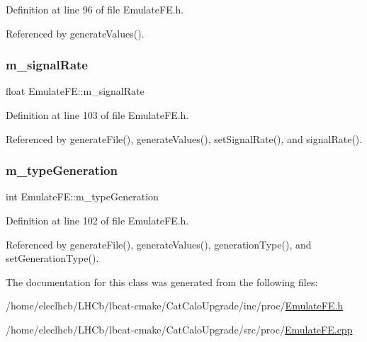 Definition at line 96 of file Emulate\+F\+E.\+h.



Referenced by generate\+Values().

\mbox{\label{classEmulateFE_a7aeff9e62f850ca6d7ee27dce02a060b}} 
\subsubsection{\texorpdfstring{m\+\_\+signal\+Rate}{m\_signalRate}}
{\footnotesize\ttfamily float Emulate\+F\+E\+::m\+\_\+signal\+Rate\hspace{0.3cm}{\ttfamily [private]}}



Definition at line 103 of file Emulate\+F\+E.\+h.



Referenced by generate\+File(), generate\+Values(), set\+Signal\+Rate(), and signal\+Rate().

\mbox{\label{classEmulateFE_aa8bd0aa42cc5f3d52930408807b3067c}} 
\subsubsection{\texorpdfstring{m\+\_\+type\+Generation}{m\_typeGeneration}}
{\footnotesize\ttfamily int Emulate\+F\+E\+::m\+\_\+type\+Generation\hspace{0.3cm}{\ttfamily [private]}}



Definition at line 102 of file Emulate\+F\+E.\+h.



Referenced by generate\+File(), generate\+Values(), generation\+Type(), and set\+Generation\+Type().



The documentation for this class was generated from the following files\+:\begin{DoxyCompactItemize}
\item 
/home/eleclhcb/\+L\+H\+Cb/lbcat-\/cmake/\+Cat\+Calo\+Upgrade/inc/proc/\hyperlink{EmulateFE_8h}{Emulate\+F\+E.\+h}\item 
/home/eleclhcb/\+L\+H\+Cb/lbcat-\/cmake/\+Cat\+Calo\+Upgrade/src/proc/\hyperlink{EmulateFE_8cpp}{Emulate\+F\+E.\+cpp}\end{DoxyCompactItemize}

